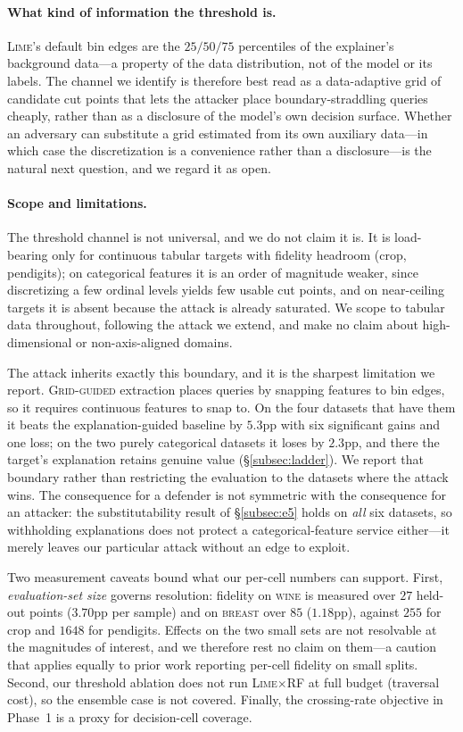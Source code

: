 \documentclass[sigconf,anonymous,review]{acmart}
\begin{document}
\paragraph{What kind of information the threshold is.} \textsc{Lime}'s default bin edges are the
$25/50/75$ percentiles of the explainer's background data---a property of the data distribution, not
of the model or its labels. The channel we identify is therefore best read as a data-adaptive grid of
candidate cut points that lets the attacker place boundary-straddling queries cheaply, rather than as
a disclosure of the model's own decision surface. Whether an adversary can substitute a grid estimated
from its own auxiliary data---in which case the discretization is a convenience rather than a
disclosure---is the natural next question, and we regard it as open.

\paragraph{Scope and limitations.} The threshold channel is not universal, and we do not claim it is.
It is load-bearing only for continuous tabular targets with fidelity headroom (crop, pendigits); on
categorical features it is an order of magnitude weaker, since discretizing a few ordinal levels
yields few usable cut points, and on near-ceiling targets it is absent because the attack is already
saturated. We scope to tabular data throughout, following the attack we extend, and make no
claim about high-dimensional or non-axis-aligned domains.

The attack inherits exactly this boundary, and it is the sharpest limitation we report.
\textsc{Grid-guided} extraction places queries by snapping features to bin edges, so it requires
continuous features to snap to. On the four datasets that have them it beats the explanation-guided
baseline by $5.3$pp with six significant gains and one loss; on the two purely categorical datasets it
loses by $2.3$pp, and there the target's explanation retains genuine value
(\S\ref{subsec:ladder}). We report that boundary rather than restricting the evaluation to the
datasets where the attack wins. The consequence for a defender is not symmetric with the consequence
for an attacker: the substitutability result of \S\ref{subsec:e5} holds on \emph{all} six datasets,
so withholding explanations does not protect a categorical-feature service either---it merely leaves
our particular attack without an edge to exploit.

Two measurement caveats bound what our per-cell numbers can support. First, \emph{evaluation-set size}
governs resolution: fidelity on \textsc{wine} is measured over $27$ held-out points ($3.70$pp per
sample) and on \textsc{breast} over $85$ ($1.18$pp), against $255$ for crop and $1648$ for pendigits.
Effects on the two small sets are not resolvable at the magnitudes of interest, and we therefore rest
no claim on them---a caution that applies equally to prior work reporting per-cell fidelity on small
splits. Second, our threshold ablation does not run \textsc{Lime}$\times$RF at full budget (traversal
cost), so the ensemble case is not covered. Finally, the crossing-rate objective in Phase~1 is a proxy
for decision-cell coverage.
\end{document}
